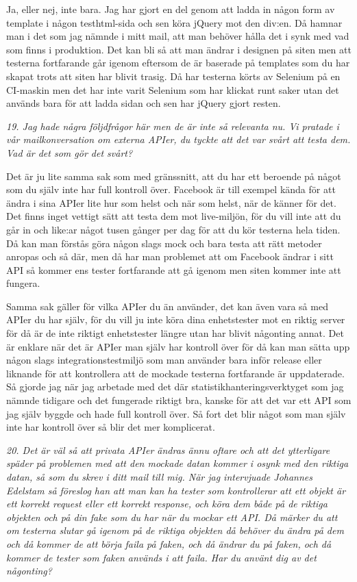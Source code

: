 \documentclass[11pt]{article}
\begin{document}
Ja, eller nej, inte bara. Jag har gjort en del genom att ladda in någon form av template i någon testhtml-sida och sen köra jQuery mot den div:en. Då hamnar man i det som jag nämnde i mitt mail, att man behöver hålla det i synk med vad som finns i produktion. Det kan bli så att man ändrar i designen på siten men att testerna fortfarande går igenom eftersom de är baserade på templates som du har skapat trots att siten har blivit trasig. Då har testerna körts av Selenium på en CI-maskin men det har inte varit Selenium som har klickat runt saker utan det används bara för att ladda sidan och sen har jQuery gjort resten.

\emph{19. Jag hade några följdfrågor här men de är inte så relevanta nu. Vi pratade i vår mailkonversation om externa APIer, du tyckte att det var svårt att testa dem. Vad är det som gör det svårt?}

Det är ju lite samma sak som med gränssnitt, att du har ett beroende på något som du själv inte har full kontroll över. Facebook är till exempel kända för att ändra i sina APIer lite hur som helst och när som helst, när de känner för det. Det finns inget vettigt sätt att testa dem mot live-miljön, för du vill inte att du går in och like:ar något tusen gånger per dag för att du kör testerna hela tiden. Då kan man förstås göra någon slags mock och bara testa att rätt metoder anropas och så där, men då har man problemet att om Facebook ändrar i sitt API så kommer ens tester fortfarande att gå igenom men siten kommer inte att fungera.

Samma sak gäller för vilka APIer du än använder, det kan även vara så med APIer du har själv, för du vill ju inte köra dina enhetstester mot en riktig server för då är de inte riktigt enhetstester längre utan har blivit någonting annat. Det är enklare när det är APIer man själv har kontroll över för då kan man sätta upp någon slags integrationstestmiljö som man använder bara inför release eller liknande för att kontrollera att de mockade testerna fortfarande är uppdaterade. Så gjorde jag när jag arbetade med det där statistikhanteringsverktyget som jag nämnde tidigare och det fungerade riktigt bra, kanske för att det var ett API som jag själv byggde och hade full kontroll över. Så fort det blir något som man själv inte har kontroll över så blir det mer komplicerat.

\emph{20. Det är väl så att privata APIer ändras ännu oftare och att det ytterligare späder på problemen med att den mockade datan kommer i osynk med den riktiga datan, så som du skrev i ditt mail till mig. När jag intervjuade Johannes Edelstam så föreslog han att man kan ha tester som kontrollerar att ett objekt är ett korrekt request eller ett korrekt response, och köra dem både på de riktiga objekten och på din fake som du har när du mockar ett API. Då märker du att om testerna slutar gå igenom på de riktiga objekten då behöver du ändra på dem och då kommer de att börja faila på faken, och då ändrar du på faken, och då kommer de tester som faken används i att faila. Har du använt dig av det någonting?}
\end{document}
